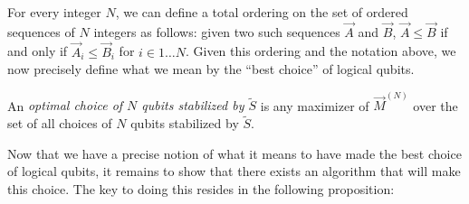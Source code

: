 \documentclass[twocolumn,showpacs,preprintnumbers,amsmath,amssymb,nofootinbib,pra,floatfix]{revtex4-1}
\newenvironment{definition}[1][Definition]{\begin{trivlist}
\item[\hskip \labelsep {\bfseries #1}]}{\end{trivlist}}
\newcommand{\lst}{\vec}
\newcommand{\set}{\tilde}
\begin{document}
For every integer $N$, we can define a total ordering on the set of ordered sequences of $N$ integers as follows:  given two such sequences $\lst A$ and $\lst B$, $\lst A \le \lst B$ if and only if $\lst A_i \le \lst B_i$ for $i \in 1\dots N$.  Given this ordering and the notation above, we now precisely define what we mean by the ``best choice'' of logical qubits.

\begin{definition}
An \emph{optimal choice of $N$ qubits stabilized by $\set S$} is any maximizer of $\lst M^{(N)}$ over the set of all choices of $N$ qubits stabilized by $\set S$.
\end{definition}
Now that we have a precise notion of what it means to have made the best choice of logical qubits, it remains to show that there exists an algorithm that will make this choice.  The key to doing this resides in the following proposition:
\end{document}
